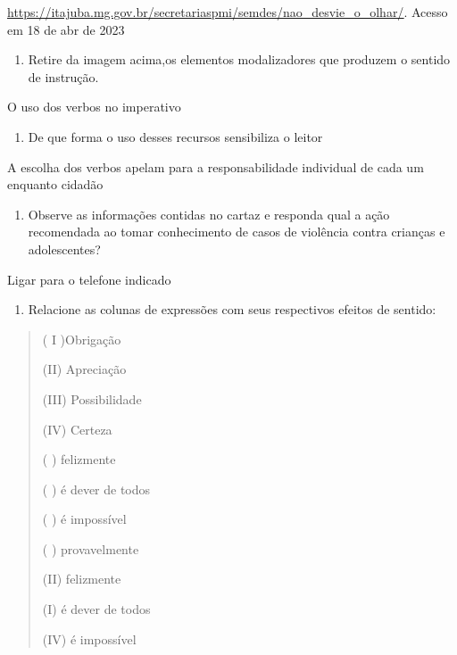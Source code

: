 {\href{https://itajuba.mg.gov.br/secretariaspmi/semdes/nao_desvie_o_olhar/}{\uline{https://itajuba.mg.gov.br/secretariaspmi/semdes/nao\_desvie\_o\_olhar/}}.
Acesso em 18 de abr de 2023

\begin{enumerate}
\def\labelenumi{\arabic{enumi})}
\tightlist
\item
  Retire da imagem acima,os elementos modalizadores que produzem o
  sentido de instrução.
\end{enumerate}

O uso dos verbos no imperativo

\begin{enumerate}
\def\labelenumi{\arabic{enumi})}
\setcounter{enumi}{1}
\tightlist
\item
  De que forma o uso desses recursos sensibiliza o leitor
\end{enumerate}

A escolha dos verbos apelam para a responsabilidade individual de cada
um enquanto cidadão

\begin{enumerate}
\def\labelenumi{\arabic{enumi})}
\setcounter{enumi}{2}
\tightlist
\item
  Observe as informações contidas no cartaz e responda qual a ação
  recomendada ao tomar conhecimento de casos de violência contra
  crianças e adolescentes?
\end{enumerate}

Ligar para o telefone indicado

\begin{enumerate}
\def\labelenumi{\arabic{enumi})}
\setcounter{enumi}{3}
\tightlist
\item
  Relacione as colunas de expressões com seus respectivos efeitos de
  sentido:
\end{enumerate}

\begin{quote}
( I )Obrigação

(II) Apreciação

(III) Possibilidade

(IV) Certeza

( ) felizmente

( ) é dever de todos

( ) é impossível

( ) provavelmente

(II) felizmente

(I) é dever de todos

(IV) é impossível


\end{quote}}
